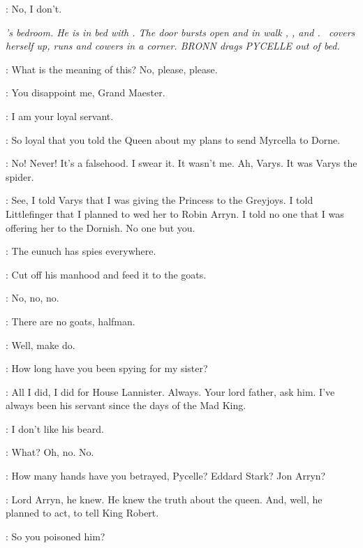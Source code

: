 \BRONN: No, I don't. 



\scene

\textit{\PYCELLE's bedroom. He is in bed with \DAISY. The door bursts open and in walk \TYRION, \TIMETT, and \BRONN. \DAISY ~covers herself up, runs and cowers in a corner. BRONN drags PYCELLE out of bed.} 

\PYCELLE: What is the meaning of this? No, please, please. 

\TYRION: You disappoint me, Grand Maester. 

\PYCELLE: I am your loyal servant. 

\TYRION: So loyal that you told the Queen about my plans to send Myrcella to Dorne. 

\PYCELLE: No! Never! It's a falsehood. I swear it. It wasn't me. Ah, Varys. It was Varys the spider. 

\TYRION: See, I told Varys that I was giving the Princess to the Greyjoys. I told Littlefinger that I planned to wed her to Robin Arryn. I told no one that I was offering her to the Dornish. No one but you. 

\PYCELLE: The eunuch has spies everywhere. 

\TYRION: Cut off his manhood and feed it to the goats. 

\PYCELLE: No, no, no. 

\TIMETT: There are no goats, halfman. 

\TYRION: Well, make do. 


\TYRION: How long have you been spying for my sister? 

\PYCELLE: All I did, I did for House Lannister. Always. Your lord father, ask him. I've always been his servant since the days of the Mad King. 

\TYRION: I don't like his beard. 


\PYCELLE: What? Oh, no. No. 


\TYRION: How many hands have you betrayed, Pycelle? Eddard Stark? Jon Arryn? 

\PYCELLE: Lord Arryn, he knew. He knew the truth about the queen. And, well, he planned to act, to tell King Robert. 

\TYRION: So you poisoned him? 

